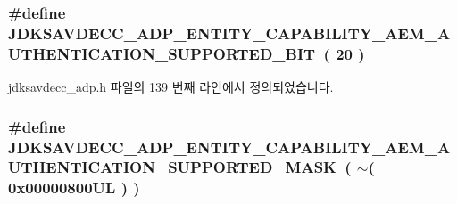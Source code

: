 \subsubsection[{\texorpdfstring{J\+D\+K\+S\+A\+V\+D\+E\+C\+C\+\_\+\+A\+D\+P\+\_\+\+E\+N\+T\+I\+T\+Y\+\_\+\+C\+A\+P\+A\+B\+I\+L\+I\+T\+Y\+\_\+\+A\+E\+M\+\_\+\+A\+U\+T\+H\+E\+N\+T\+I\+C\+A\+T\+I\+O\+N\+\_\+\+S\+U\+P\+P\+O\+R\+T\+E\+D\+\_\+\+B\+IT}{JDKSAVDECC_ADP_ENTITY_CAPABILITY_AEM_AUTHENTICATION_SUPPORTED_BIT}}]{\setlength{\rightskip}{0pt plus 5cm}\#define J\+D\+K\+S\+A\+V\+D\+E\+C\+C\+\_\+\+A\+D\+P\+\_\+\+E\+N\+T\+I\+T\+Y\+\_\+\+C\+A\+P\+A\+B\+I\+L\+I\+T\+Y\+\_\+\+A\+E\+M\+\_\+\+A\+U\+T\+H\+E\+N\+T\+I\+C\+A\+T\+I\+O\+N\+\_\+\+S\+U\+P\+P\+O\+R\+T\+E\+D\+\_\+\+B\+IT~( 20 )}\hypertarget{group__adp__entity__capability_gad508c2d381e82fa1ea17b6751d49966a}{}\label{group__adp__entity__capability_gad508c2d381e82fa1ea17b6751d49966a}


jdksavdecc\+\_\+adp.\+h 파일의 139 번째 라인에서 정의되었습니다.

\subsubsection[{\texorpdfstring{J\+D\+K\+S\+A\+V\+D\+E\+C\+C\+\_\+\+A\+D\+P\+\_\+\+E\+N\+T\+I\+T\+Y\+\_\+\+C\+A\+P\+A\+B\+I\+L\+I\+T\+Y\+\_\+\+A\+E\+M\+\_\+\+A\+U\+T\+H\+E\+N\+T\+I\+C\+A\+T\+I\+O\+N\+\_\+\+S\+U\+P\+P\+O\+R\+T\+E\+D\+\_\+\+M\+A\+SK}{JDKSAVDECC_ADP_ENTITY_CAPABILITY_AEM_AUTHENTICATION_SUPPORTED_MASK}}]{\setlength{\rightskip}{0pt plus 5cm}\#define J\+D\+K\+S\+A\+V\+D\+E\+C\+C\+\_\+\+A\+D\+P\+\_\+\+E\+N\+T\+I\+T\+Y\+\_\+\+C\+A\+P\+A\+B\+I\+L\+I\+T\+Y\+\_\+\+A\+E\+M\+\_\+\+A\+U\+T\+H\+E\+N\+T\+I\+C\+A\+T\+I\+O\+N\+\_\+\+S\+U\+P\+P\+O\+R\+T\+E\+D\+\_\+\+M\+A\+SK~( $\sim$( 0x00000800\+U\+L ) )}\hypertarget{group__adp__entity__capability_ga5dc48eda67fb232e9af9edaf5d230f7d}{}\label{group__adp__entity__capability_ga5dc48eda67fb232e9af9edaf5d230f7d}


